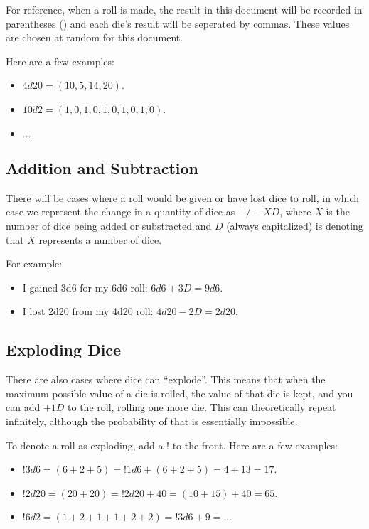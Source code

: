 \documentclass[../main.tex]{subfiles}
\begin{document}
    For reference, when a roll is made, the result in this document will be recorded in parentheses () and each die's result will be seperated by commas. These values are chosen at random for this document.

    Here are a few examples:

    \begin{itemize}
        \item $4d20 = (10, 5, 14, 20)$.
        \item $10d2 = (1, 0, 1, 0, 1, 0, 1, 0, 1, 0)$.
        \item $\dots$
    \end{itemize}

    \subsection{Addition and Subtraction}

    There will be cases where a roll would be given or have lost dice to roll, in which case we represent the change in a quantity of dice as $+/-XD$, where $X$ is the number of dice being added or substracted and $D$ (always capitalized) is denoting that $X$ represents a number of dice.

    For example:
    \begin{itemize}
        \item I gained 3d6 for my 6d6 roll: $6d6 + 3D = 9d6$.
        \item I lost 2d20 from my 4d20 roll: $4d20 - 2D = 2d20$.
    \end{itemize}

    \subsection{Exploding Dice}

    There are also cases where dice can ``explode''. This means that when the maximum possible value of a die is rolled, the value of that die is kept, and you can add $+1D$ to the roll, rolling one more die. This can theoretically repeat infinitely, although the probability of that is essentially impossible.

    To denote a roll as exploding, add a $!$ to the front. Here are a few examples:

    \begin{itemize}
        \item $!3d6 = (6 + 2 + 5) = !1d6 + (6 + 2 + 5) = 4 + 13 = 17$.
        \item $!2d20 = (20 + 20) = !2d20 + 40 = (10 + 15) + 40 = 65$.
        \item $!6d2 = (1 + 2 + 1 + 1 + 2 + 2) = !3d6 + 9 = \dots$
    \end{itemize}
\end{document}
